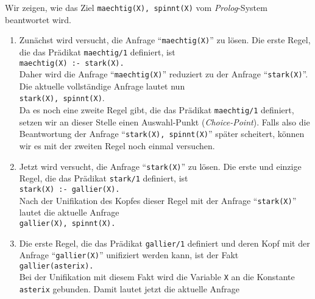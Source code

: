 Wir zeigen, wie das Ziel \texttt{maechtig(X), spinnt(X)} 
vom \textsl{Prolog}-System beantwortet wird.  
\begin{enumerate}
\item Zun\"{a}chst wird versucht, die Anfrage ``\texttt{maechtig(X)}'' zu l\"{o}sen.
      Die erste Regel, die das Pr\"{a}dikat \texttt{maechtig/1} definiert,
      ist \\[0.2cm]
      \hspace*{1.3cm} \texttt{maechtig(X) :- stark(X).}\\[0.2cm]
      Daher wird die Anfrage ``\texttt{maechtig(X)}'' reduziert zu der Anfrage 
      ``\texttt{stark(X)}''.  Die aktuelle vollst\"{a}ndige Anfrage lautet nun \\[0.2cm]
      \hspace*{1.3cm} \texttt{stark(X), spinnt(X)}. \\[0.2cm]
      Da es noch eine zweite Regel gibt, die das Pr\"{a}dikat \texttt{maechtig/1} definiert,
      setzen wir an dieser Stelle einen Auswahl-Punkt (\emph{Choice-Point}).  Falls also die 
      Beantwortung der Anfrage ``\texttt{stark(X), spinnt(X)}'' sp\"{a}ter scheitert,
      k\"{o}nnen wir es mit der zweiten Regel noch einmal versuchen.
\item Jetzt wird versucht, die Anfrage ``\texttt{stark(X)}'' zu l\"{o}sen.
      Die erste und einzige Regel, die das Pr\"{a}dikat \texttt{stark/1} definiert, ist 
      \\[0.2cm]
      \hspace*{1.3cm} \texttt{stark(X) :- gallier(X).} \\[0.2cm]
      Nach der Unifikation des Kopfes dieser Regel mit der Anfrage ``\texttt{stark(X)}''
      lautet die aktuelle Anfrage \\[0.2cm]
      \hspace*{1.3cm} 
      \texttt{gallier(X), spinnt(X).}
\item Die erste Regel, die das Pr\"{a}dikat \texttt{gallier/1} definiert und deren Kopf
      mit der Anfrage ``\texttt{gallier(X)}'' unifiziert werden kann, ist der Fakt \\[0.2cm]
      \hspace*{1.3cm} \texttt{gallier(asterix).} \\[0.2cm]
      Bei der Unifikation mit diesem Fakt wird die Variable \texttt{X} an die Konstante
      \texttt{asterix} gebunden.  Damit lautet jetzt die aktuelle Anfrage \\[0.2cm]
      \hspace*{1.3cm} 

\end{enumerate}
